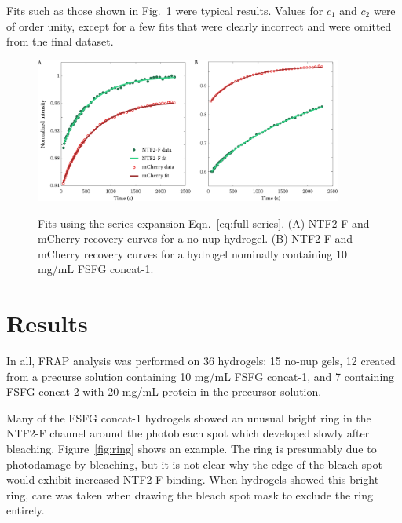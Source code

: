 Fits such as those shown in Fig.~\ref{fig:series-fits} were typical results.  Values for $c_1$ and $c_2$ were of order unity, except for a few fits that were clearly incorrect and were omitted from the final dataset.

\begin{figure}
\caption[Fits to recovery curves using Fourier transform solution.]{Fits using the series expansion Eqn.~\ref{eq:full-series}. (A) NTF2-F and mCherry recovery curves for a no-nup hydrogel.  (B) NTF2-F and mCherry recovery curves for a hydrogel nominally containing 10 mg/mL FSFG concat-1.}
\centering
\includegraphics[width=0.9\textwidth]{figs/ch04/series-fits.pdf}
\label{fig:series-fits}
\end{figure} 

\section{Results}

In all, FRAP analysis was performed on 36 hydrogels: 15 no-nup gels, 12 created from a precurse solution containing 10 mg/mL FSFG concat-1, and 7 containing FSFG concat-2 with 20 mg/mL protein in the precursor solution. %

Many of the FSFG concat-1 hydrogels showed an unusual bright ring in the NTF2-F channel around the photobleach spot which developed slowly after bleaching.  Figure~\ref{fig:ring} shows an example.  The ring is presumably due to photodamage by bleaching, but it is not clear why the edge of the bleach spot would exhibit increased NTF2-F binding.  When hydrogels showed this bright ring, care was taken when drawing the bleach spot mask to exclude the ring entirely.

